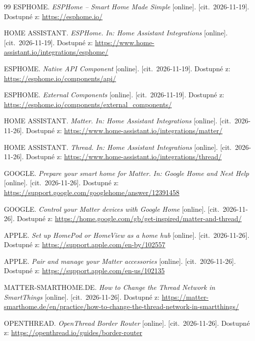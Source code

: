 \begin{thebibliography}{99}
ESPHOME. \emph{ESPHome -- Smart Home Made Simple}
[online]. [cit.~2026-11-19].
Dostupné z: \url{https://esphome.io/}

HOME ASSISTANT. \emph{ESPHome. In: Home Assistant Integrations}
[online]. [cit.~2026-11-19].
Dostupné z: \url{https://www.home-assistant.io/integrations/esphome/}

ESPHOME. \emph{Native API Component}
[online]. [cit.~2026-11-19].
Dostupné z: \url{https://esphome.io/components/api/}

ESPHOME. \emph{External Components}
[online]. [cit.~2026-11-19].
Dostupné z: \url{https://esphome.io/components/external_components/}

HOME ASSISTANT. \emph{Matter. In: Home Assistant Integrations}
[online]. [cit.~2026-11-26].
Dostupné z: \url{https://www.home-assistant.io/integrations/matter/}

HOME ASSISTANT. \emph{Thread. In: Home Assistant Integrations}
[online]. [cit.~2026-11-26].
Dostupné z: \url{https://www.home-assistant.io/integrations/thread/}

GOOGLE. \emph{Prepare your smart home for Matter. In: Google Home and Nest Help}
[online]. [cit.~2026-11-26].
Dostupné z: \url{https://support.google.com/googlehome/answer/12391458}

GOOGLE. \emph{Control your Matter devices with Google Home}
[online]. [cit.~2026-11-26].
Dostupné z: \url{https://home.google.com/gb/get-inspired/matter-and-thread/}

APPLE. \emph{Set up HomePod or HomeView as a home hub}
[online]. [cit.~2026-11-26].
Dostupné z: \url{https://support.apple.com/en-by/102557}

APPLE. \emph{Pair and manage your Matter accessories}
[online]. [cit.~2026-11-26].
Dostupné z: \url{https://support.apple.com/en-us/102135}

MATTER-SMARTHOME.DE. \emph{How to Change the Thread Network in SmartThings}
[online]. [cit.~2026-11-26].
Dostupné z: \url{https://matter-smarthome.de/en/practice/how-to-change-the-thread-network-in-smartthings/}

OPENTHREAD. \emph{OpenThread Border Router}
[online]. [cit.~2026-11-26].
Dostupné z: \url{https://openthread.io/guides/border-router}


\end{thebibliography}
